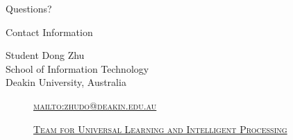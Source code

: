 \documentclass[
 size=14pt,
 paper=smartboard,  %
 mode=present, 		%
 display=slides, 	%
 style=tuliplab,  	%
 pauseslide,
 fleqn,leqno]{powerdot}
\begin{document}
%
\begin{slide}[toc=,bm=]{Questions?}
\begin{center}
\begin{figure}
\end{figure}
\end{center}
\end{slide}


\begin{wideslide}[toc=,bm=]{Contact Information}
\centering
{}
{
Student Dong Zhu\\
School of Information Technology\\
Deakin University, Australia
\begin{description}
\item[\textcolor{orange}{\faEnvelope}] \href{mailto:zhudo@deakin.edu.au}
{\textsc{\footnotesize{mailto:zhudo@deakin.edu.au}}}

\item[\textcolor{orange}{\faHome}] \href{http://www.tulip.org.au}
{\textsc{\footnotesize{Team for Universal Learning and Intelligent Processing}}}
\end{description}
}
\end{wideslide}
\end{document}
